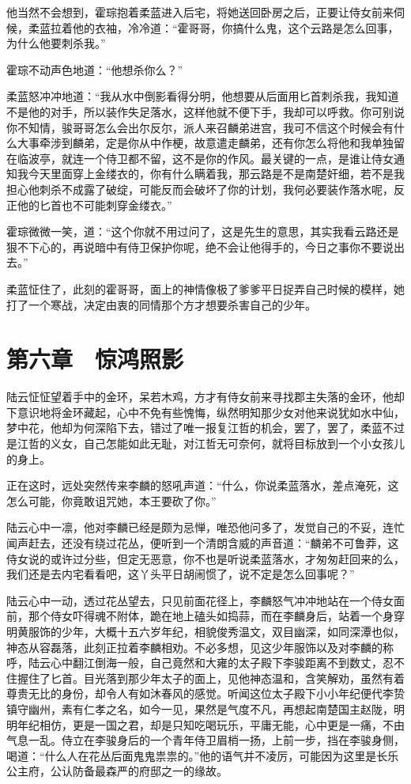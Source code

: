 他当然不会想到，霍琮抱着柔蓝进入后宅，将她送回卧房之后，正要让侍女前来伺候，柔蓝拉着他的衣袖，冷冷道：“霍哥哥，你搞什么鬼，这个云路是怎么回事，为什么他要刺杀我。”

霍琮不动声色地道：“他想杀你么？”

柔蓝怒冲冲地道：“我从水中倒影看得分明，他想要从后面用匕首刺杀我，我知道不是他的对手，所以装作失足落水，这样他就不便下手，我却可以呼救。你可别说你不知情，骏哥哥怎么会出尔反尔，派人来召麟弟进宫，我可不信这个时候会有什么大事牵涉到麟弟，定是你从中作梗，故意遣走麟弟，还有你怎么将他和我单独留在临波亭，就连一个侍卫都不留，这不是你的作风。最关键的一点，是谁让侍女通知我今天里面穿上金缕衣的，你有什么瞒着我，那云路是不是南楚奸细，若不是我担心他刺杀不成露了破绽，可能反而会破坏了你的计划，我何必要装作落水呢，反正他的匕首也不可能刺穿金缕衣。”

霍琮微微一笑，道：“这个你就不用过问了，这是先生的意思，其实我看云路还是狠不下心的，再说暗中有侍卫保护你呢，绝不会让他得手的，今日之事你不要说出去。”

柔蓝怔住了，此刻的霍哥哥，面上的神情像极了爹爹平日捉弄自己时候的模样，她打了一个寒战，决定由衷的同情那个方才想要杀害自己的少年。

\chapter{第六章　惊鸿照影}

陆云怔怔望着手中的金环，呆若木鸡，方才有侍女前来寻找郡主失落的金环，他却下意识地将金环藏起，心中不免有些愧悔，纵然明知那少女对他来说犹如水中仙，梦中花，他却为何深陷下去，错过了唯一报复江哲的机会，罢了，罢了，柔蓝不过是江哲的义女，自己怎能如此无耻，对江哲无可奈何，就将目标放到一个小女孩儿的身上。

正在这时，远处突然传来李麟的怒吼声道：“什么，你说柔蓝落水，差点淹死，这怎么可能，你竟敢诅咒她，本王要砍了你。”

陆云心中一凛，他对李麟已经是颇为忌惮，唯恐他问多了，发觉自己的不妥，连忙闻声赶去，还没有绕过花丛，便听到一个清朗含威的声音道：“麟弟不可鲁莽，这侍女说的或许过分些，但定无恶意，你不也是听说柔蓝落水，才匆匆赶回来的么，我们还是去内宅看看吧，这丫头平日胡闹惯了，说不定是怎么回事呢？”

陆云心中一动，透过花丛望去，只见前面花径上，李麟怒气冲冲地站在一个侍女面前，那个侍女吓得魂不附体，跪在地上磕头如捣蒜，而在李麟身后，站着一个身穿明黄服饰的少年，大概十五六岁年纪，相貌俊秀温文，双目幽深，如同深潭也似，神态从容磊落，此刻正拉着李麟相劝。不必多想，见这少年服饰以及对李麟的称呼，陆云心中翻江倒海一般，自己竟然和大雍的太子殿下李骏距离不到数丈，忍不住握住了匕首。目光落到那少年太子的面上，见他神态温和，含笑解劝，虽然有着尊贵无比的身份，却令人有如沐春风的感觉。听闻这位太子殿下小小年纪便代李贽镇守幽州，素有仁孝之名，如今一见，果然是气度不凡，再想起南楚国主赵陇，明明年纪相仿，更是一国之君，却是只知吃喝玩乐，平庸无能，心中更是一痛，不由气息一乱。侍立在李骏身后的一个青年侍卫眉梢一扬，上前一步，挡在李骏身侧，喝道：“什么人在花丛后面鬼鬼祟祟的。”他的语气并不凌厉，可能因为这里是长乐公主府，公认防备最森严的府邸之一的缘故。

